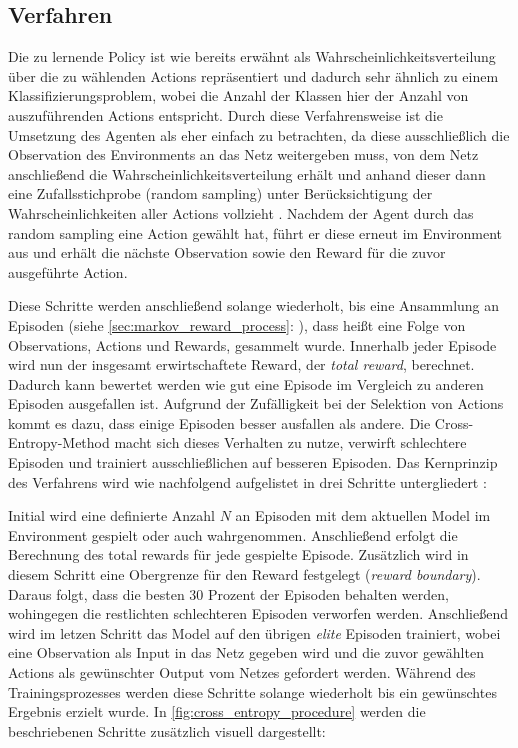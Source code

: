 \documentclass[11pt]{scrartcl}
\begin{document}
\subsection{Verfahren}
Die zu lernende Policy ist wie bereits erwähnt als Wahrscheinlichkeitsverteilung über die 
zu wählenden Actions repräsentiert und dadurch sehr ähnlich zu einem Klassifizierungsproblem,
wobei die Anzahl der Klassen hier der Anzahl von auszuführenden Actions entspricht. Durch
diese Verfahrensweise ist die Umsetzung des Agenten als eher einfach zu betrachten, da
diese ausschließlich die Observation des Environments an das Netz weitergeben muss, von
dem Netz anschließend die Wahrscheinlichkeitsverteilung erhält und anhand dieser dann eine
Zufallsstichprobe (random sampling) unter Berücksichtigung der Wahrscheinlichkeiten aller
Actions vollzieht \cite[~S.78]{L2018}. Nachdem der Agent durch das random sampling eine
Action gewählt hat, führt er diese erneut im Environment aus und erhält die nächste
Observation sowie den Reward für die zuvor ausgeführte Action.

Diese Schritte werden anschließend solange wiederholt, bis eine Ansammlung an Episoden (siehe 
\autoref{sec:markov_reward_process}: ), dass heißt eine Folge
von Observations, Actions und Rewards, gesammelt wurde. Innerhalb jeder Episode wird nun der
insgesamt erwirtschaftete Reward, der \textit{total reward}, berechnet. Dadurch kann bewertet werden
wie gut eine Episode im Vergleich zu anderen Episoden ausgefallen ist. Aufgrund der Zufälligkeit
bei der Selektion von Actions kommt es dazu, dass einige Episoden besser ausfallen als andere.
Die Cross-Entropy-Method macht sich dieses Verhalten zu nutze, verwirft schlechtere Episoden und
trainiert ausschließlichen auf besseren Episoden. Das Kernprinzip des Verfahrens wird wie nachfolgend
aufgelistet in drei Schritte untergliedert \cite[~S.80 f.]{L2018}:

Initial wird eine definierte Anzahl $N$ an Episoden mit dem aktuellen Model im Environment gespielt
oder auch wahrgenommen. Anschließend erfolgt die Berechnung des total rewards für jede gespielte
Episode. Zusätzlich wird in diesem Schritt eine Obergrenze für den Reward festgelegt 
(\textit{reward boundary}). Daraus folgt, dass die besten 30 Prozent der Episoden behalten werden,
wohingegen die restlichten schlechteren Episoden verworfen werden. Anschließend wird im letzen Schritt
das Model auf den übrigen \textit{elite} Episoden trainiert, wobei eine Observation als Input in das
Netz gegeben wird und die zuvor gewählten Actions als gewünschter Output vom Netzes gefordert werden.
Während des Trainingsprozesses werden diese Schritte solange wiederholt bis ein gewünschtes
Ergebnis erzielt wurde. In \autoref{fig:cross_entropy_procedure} werden die beschriebenen Schritte
zusätzlich visuell dargestellt:
\end{document}
